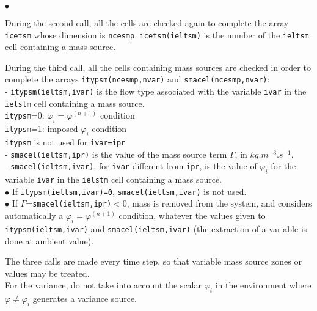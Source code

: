 {{{\begin{list}{$\bullet$}{}
\item During the second call, all the cells are checked again to
      complete the array \texttt{icetsm} whose dimension is
      \texttt{ncesmp}. \mbox{\texttt{icetsm(ieltsm)}} is the number of the
      \texttt{ieltsm}\raisebox{1ex}{\small th} cell containing a mass source.

\item During the third call, all the cells containing mass sources are
      checked in order to complete the arrays
      \mbox{\texttt{itypsm(ncesmp,nvar)}} and
      \mbox{\texttt{smacel(ncesmp,nvar)}}:\\
- \texttt{itypsm(ieltsm,ivar)} is the flow type associated with the variable
      \texttt{ivar} in the \texttt{ielstm}\raisebox{1ex}{\small th} cell
      containing a mass source.\\
\hspace*{1cm}\texttt{itypsm}=0: $\varphi_i=\varphi^{(n+1)}$ condition\\
\hspace*{1cm}\texttt{itypsm}=1: imposed $\varphi_i$ condition\\
\hspace*{1cm}\texttt{itypsm} is not used for \texttt{ivar=ipr}\\
- \texttt{smacel(ieltsm,ipr)} is the value of the mass source term $\Gamma$, in
$kg.m^{-3}.s^{-1}$.\\
- \texttt{smacel(ieltsm,ivar)}, for \texttt{ivar} different from
\texttt{ipr}, is the value
of $\varphi_i$ for the variable \texttt{ivar} in the
\texttt{ielstm}\raisebox{1ex}{\small th} cell containing a mass source.\\

$\bullet$ If \texttt{itypsm(ieltsm,ivar)=0}, \texttt{smacel(ieltsm,ivar)}
      is not used.\\
$\bullet$ If $\Gamma$=\texttt{smacel(ieltsm,ipr)}$<$0, mass is removed from
      the system, and \CS considers automatically a
      $\varphi_i=\varphi^{(n+1)}$ condition, whatever the values given
      to \texttt{itypsm(ieltsm,ivar)} and \texttt{smacel(ieltsm,ivar)}
      (the extraction of a variable is done at ambient value).
\end{list}

The three calls are made every time step, so that variable mass source
zones or values may be treated.\\

For the variance, do not take into account the scalar $\varphi_i$ in the environment
where $\varphi\ne\varphi_i$ generates a variance source.

}}}
